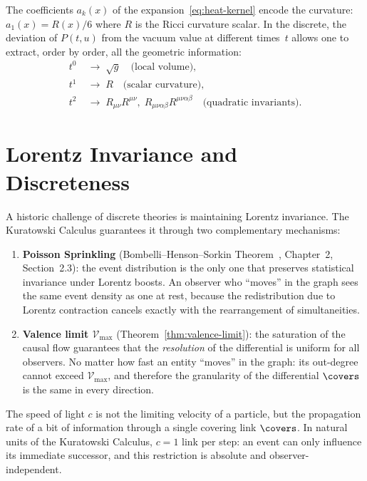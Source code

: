 \noindent
The coefficients $a_k(x)$ of the
expansion~\eqref{eq:heat-kernel} encode the curvature:
$a_1(x) = R(x)/6$ where $R$ is the Ricci curvature scalar. In the
discrete, the deviation of $P(t,u)$ from the vacuum value at
different times~$t$ allows one to extract, order by order, all the
geometric information:
\begin{align}
  t^0 &\;\to\; \sqrt{g} \quad\text{(local volume)},
  \label{eq:heat-order0}\\
  t^1 &\;\to\; R \quad\text{(scalar curvature)},
  \label{eq:heat-order1}\\
  t^2 &\;\to\; R_{\mu\nu}R^{\mu\nu},\;
  R_{\mu\nu\alpha\beta}R^{\mu\nu\alpha\beta}
  \quad\text{(quadratic invariants)}.
  \label{eq:heat-order2}
\end{align}

\section{Lorentz Invariance and Discreteness}

A historic challenge of discrete theories is maintaining Lorentz
invariance. The Kuratowski Calculus guarantees it through two
complementary mechanisms:

\begin{enumerate}
  \item \textbf{Poisson Sprinkling}
    (Bombelli--Henson--Sorkin
    Theorem~\cite{bombelli2009}, Chapter~2,
    Section~2.3): the event distribution is the only one that
    preserves statistical invariance under Lorentz boosts. An observer
    who ``moves'' in the graph sees the same event density as one at
    rest, because the redistribution due to Lorentz contraction
    cancels exactly with the rearrangement of simultaneities.

  \item \textbf{Valence limit $\mathcal{V}_{\max}$}
    (Theorem~\ref{thm:valence-limit}): the saturation of the causal
    flow guarantees that the \emph{resolution} of the differential is
    uniform for all observers. No matter how fast an entity ``moves''
    in the graph: its out-degree cannot exceed $\mathcal{V}_{\max}$,
    and therefore the granularity of the differential $\covers$ is
    the same in every direction.
\end{enumerate}

\begin{result}[title={The Speed of Light as Causal Bit}]
\label{res:speed-of-light}
The speed of light $c$ is not the limiting velocity of a particle,
but the propagation rate of a bit of information through a single
covering link $\covers$. In natural units of the Kuratowski Calculus,
$c = 1$ link per step: an event can only influence its immediate
successor, and this restriction is absolute and observer-independent.
\end{result}

